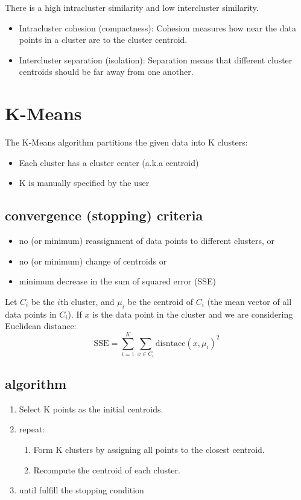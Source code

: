 \documentclass[letterpaper,12pt]{article}
\begin{document}
There is a high intra\-cluster similarity and low inter\-cluster similarity.

\begin{itemize}
    \item Intra\-cluster cohesion (compactness): Cohesion measures how near the data points in a cluster are to the cluster centroid. 
    \item Inter\-cluster separation (isolation): Separation means that different cluster centroids should be far away from one another. 
\end{itemize}

\section{K-Means}
The K-Means algorithm partitions the given data into K clusters:
\begin{itemize}
    \item Each cluster has a cluster center (a.k.a centroid)
    \item K is manually specified by the user
\end{itemize}

\subsection{convergence (stopping) criteria}
\begin{itemize}
    \item no (or minimum) reassignment of data points to different clusters, or 
    \item no (or minimum) change of centroids or 
    \item minimum decrease in the sum of squared error (SSE)
\end{itemize}

Let $C_i$ be the $i$\-th cluster, and $\mu_i$ be the centroid of $C_i$ (the mean vector of all data points in $C_i$). If $x$ is the data point in the cluster and we are considering Euclidean distance:
\[\text{SSE}=\sum_{i=1}^{K}\sum_{x\in C_i}\text{disntace}(x,\mu_i)^2\]

\subsection{algorithm}
\begin{enumerate}
    \item Select K points as the initial centroids.
    \item repeat:
    \begin{enumerate}
        \item Form K clusters by assigning all points to the closest centroid.
        \item Recompute the centroid of each cluster.
    \end{enumerate}
    \item until fulfill the stopping condition
\end{enumerate}
\end{document}
